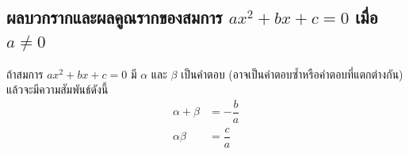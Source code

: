 \subsection{ผลบวกรากและผลคูณรากของสมการ $ax^2+bx+c=0$ เมื่อ $a\neq 0$}
\begin{remarkbox}
	ถ้าสมการ $ax^2+bx+c=0$ มี $\alpha$ และ $\beta$ เป็นคำตอบ  
	(อาจเป็นคำตอบซ้ำหรือคำตอบที่แตกต่างกัน) แล้วจะมีความสัมพันธ์ดังนี้
	\begin{align*}
		\alpha+\beta &=-\dfrac{b}{a}\\
		\alpha\beta &=\dfrac{c}{a}
	\end{align*}
\end{remarkbox}




